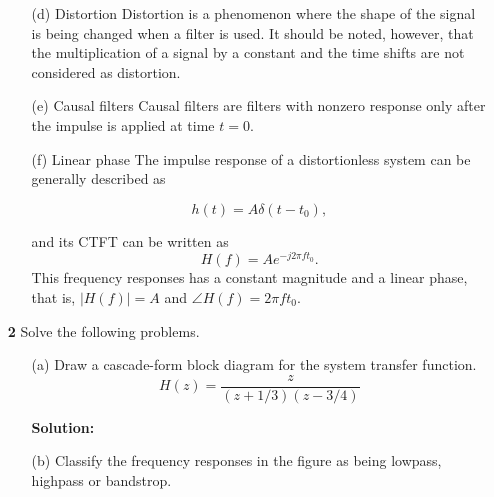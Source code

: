 \documentclass[a4paper, 12pt]{article}
\begin{document}
\begin{itemize}
\begin{itemize}
\item[(d)]{Distortion}
Distortion is a phenomenon where the shape of the signal is being changed when a filter is used. It should be noted, however, that the multiplication of a signal by a constant and the time shifts are not considered as distortion.

\item[(e)]{Causal filters}
Causal filters are filters with nonzero response only after the impulse is applied at time $t = 0$.

\item[(f)]{Linear phase}
The impulse response of a distortionless system can be generally described as 

\begin{equation}
h(t) = A\delta (t - t_{0}),
\end{equation}

and its CTFT can be written as 
\begin{equation}
H(f) = A e^{-j 2 \pi f t_{0}}.
\end{equation}
This frequency responses has a constant magnitude and a linear phase, that is, $|H(f)| = A$ and $\angle H(f) = 2 \pi f t_{0}$. 
\end{itemize}

\item[\textbf{2}]{Solve the following problems.}

\begin{itemize}
\item[(a)]{Draw a cascade-form block diagram for the system transfer function.}
\begin{equation}
H(z) = \frac{z}{(z + 1/3)(z - 3/4)}
\end{equation}

\textbf{Solution:}
\begin{figure}[h!]
\end{figure}

\item[(b)]{Classify the frequency responses in the figure as being lowpass, highpass or bandstrop.}

\begin{figure}[h!]
\end{figure}


\end{itemize}
\end{itemize}
\end{document}
